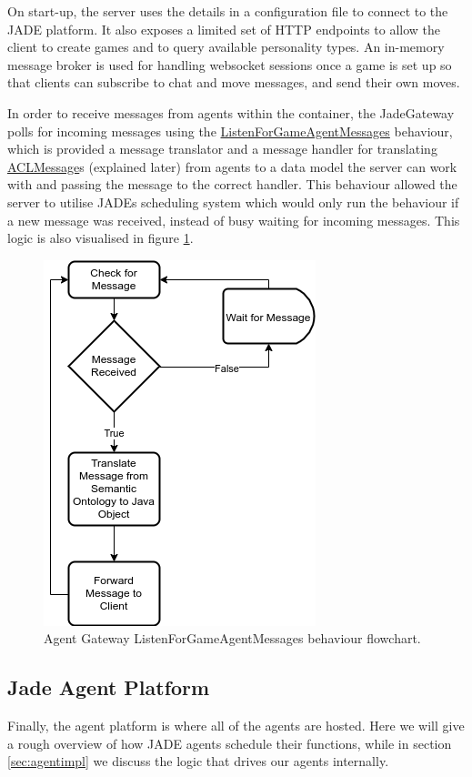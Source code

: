 \documentclass{article}
\begin{document}
On start-up, the server uses the details in a configuration file to connect to the JADE platform. It also exposes a limited set of HTTP endpoints to allow the client to create games and to query available personality types. An in-memory message broker is used for handling websocket sessions once a game is set up so that clients can subscribe to chat and move messages, and send their own moves. 

In order to receive messages from agents within the container, the JadeGateway polls for incoming messages using the \url{ListenForGameAgentMessages} behaviour, which is provided a message translator and a message handler for translating \url{ACLMessage}s (explained later) from agents to a data model the server can work with and passing the message to the correct handler. This behaviour allowed the server to utilise JADEs scheduling system which would only run the behaviour if a new message was received, instead of busy waiting for incoming messages. This logic is also visualised in figure \ref{fig:translate}.

\begin{figure}[!ht]
	\centering
	\includegraphics[width=0.45\linewidth]{images/translate}
	\caption{Agent Gateway ListenForGameAgentMessages behaviour flowchart.}
	\label{fig:translate}
\end{figure}

\subsection{Jade Agent Platform}

Finally, the agent platform is where all of the agents are hosted. Here we will give a rough overview of how JADE agents schedule their functions, while in section \ref{sec:agentimpl} we discuss the logic that drives our agents internally.
\end{document}
